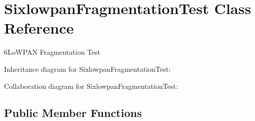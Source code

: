\hypertarget{classSixlowpanFragmentationTest}{}\section{Sixlowpan\+Fragmentation\+Test Class Reference}
\label{classSixlowpanFragmentationTest}


6\+Lo\+W\+P\+AN Fragmentation Test  




Inheritance diagram for Sixlowpan\+Fragmentation\+Test\+:


Collaboration diagram for Sixlowpan\+Fragmentation\+Test\+:
\subsection*{Public Member Functions}

